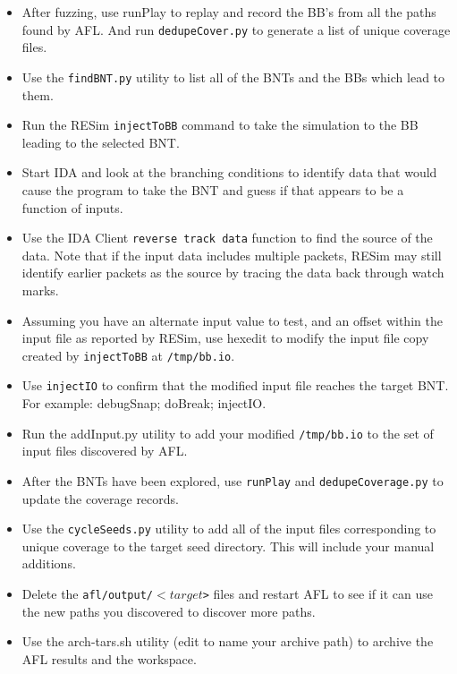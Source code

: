 \documentclass[titlepage]{article}
\begin{document}
\begin{itemize}
\item After fuzzing, use runPlay to replay and record the BB's from all the paths found by AFL.  And run {\tt dedupeCover.py} to generate a list of unique coverage files.
\item Use the {\tt findBNT.py} utility to list all of the BNTs and the BBs which lead to them.
\item Run the RESim {\tt injectToBB} command to take the simulation to the BB leading to the selected BNT.
\item Start IDA and look at the branching conditions to identify data that would cause the program to take the BNT and guess if that appears to be a function of inputs.  
\item Use the IDA Client {\tt reverse track data} function to find the source of the data.  Note that if the input data includes multiple packets, RESim may still
identify earlier packets as the source by tracing the data back through watch marks.
\item Assuming you have an alternate input value to test, and an offset within the input file as reported by RESim, use hexedit to modify the input file copy
created by {\tt injectToBB} at {\tt /tmp/bb.io}.
\item Use {\tt injectIO} to confirm that the modified input file reaches the target BNT.  For example: debugSnap; doBreak; injectIO.
\item Run the addInput.py utility to add your modified {\tt /tmp/bb.io} to the set of input files discovered by AFL.
\item After the BNTs have been explored, use {\tt runPlay} and {\tt dedupeCoverage.py} to update the coverage records.
\item Use the {\tt cycleSeeds.py} utility to add all of the input files corresponding to unique coverage to the target seed directory.  This will include your manual additions.
\item Delete the {\tt afl/output/$<target$>} files and restart AFL to see if it can use the new paths you discovered to discover more paths.
\item Use the arch-tars.sh utility (edit to name your archive path) to archive the AFL results and the workspace.
\end{itemize}
\end{document}
